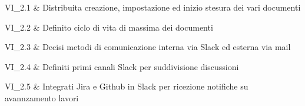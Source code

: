 VI\_2.1 & Distribuita creazione, impostazione ed inizio stesura dei vari documenti

\tabularnewline
VI\_2.2 & Definito ciclo di vita di massima dei documenti

\tabularnewline
VI\_2.3 & Decisi metodi di comunicazione interna via Slack ed esterna via mail

\tabularnewline
VI\_2.4 & Definiti primi canali Slack per suddivisione discussioni

\tabularnewline
VI\_2.5 & Integrati Jira e Github in Slack per ricezione notifiche su avannzamento lavori